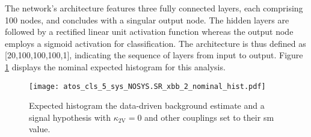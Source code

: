 The network's architecture features three fully connected layers, each comprising 100 nodes, and concludes with a singular output node. The hidden layers are followed by a rectified linear unit activation function whereas the output node employs a sigmoid activation for classification. The architecture is thus defined as [20,100,100,100,1], indicating the sequence of layers from input to output. Figure \ref{fig:nominal-hist} displays the nominal expected histogram for this analysis.


\begin{figure}
    \centering
    \texttt{[image: atos\_cls\_5\_sys\_NOSYS.SR\_xbb\_2\_nominal\_hist.pdf]}
    \caption[]{Expected histogram the data-driven background estimate and a signal hypothesis with $\kappa_\text{2V}=0$ and other couplings set to their \ac{sm} value. }
    \label{fig:nominal-hist}
\end{figure}
